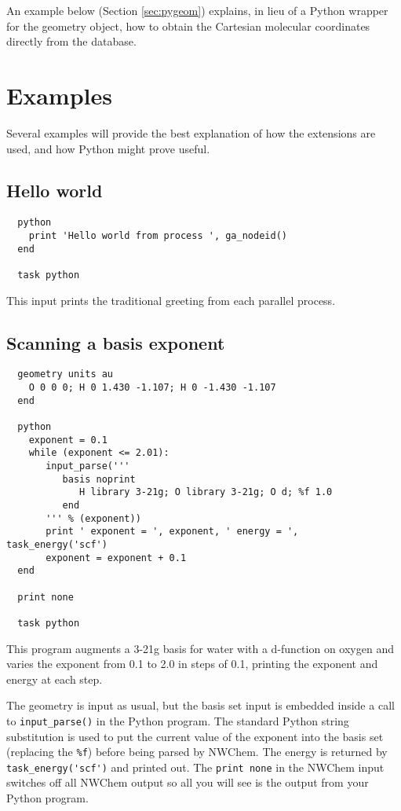 An example below (Section \ref{sec:pygeom}) explains, in lieu of a
Python wrapper for the geometry object, how to obtain the Cartesian
molecular coordinates directly from the database.

\section{Examples}

Several examples will provide the best explanation of how the extensions
are used, and how Python might prove useful.

\subsection{Hello world}

\begin{verbatim}
  python
    print 'Hello world from process ', ga_nodeid()
  end

  task python
\end{verbatim}

This input prints the traditional greeting from each parallel process.

\subsection{Scanning a basis exponent}
\begin{verbatim}
  geometry units au
    O 0 0 0; H 0 1.430 -1.107; H 0 -1.430 -1.107
  end

  python
    exponent = 0.1
    while (exponent <= 2.01):
       input_parse('''
          basis noprint
             H library 3-21g; O library 3-21g; O d; %f 1.0
          end
       ''' % (exponent))
       print ' exponent = ', exponent, ' energy = ', task_energy('scf')
       exponent = exponent + 0.1
  end

  print none

  task python
\end{verbatim}

This program augments a 3-21g basis for water with a d-function on
oxygen and varies the exponent from 0.1 to 2.0 in steps of 0.1,
printing the exponent and energy at each step.  

The geometry is input as usual, but the basis set input is embedded
inside a call to \verb+input_parse()+ in the Python program.  The
standard Python string substitution is used to put the current value of
the exponent into the basis set (replacing the \verb+%f+) before being
parsed by NWChem.  The energy is returned by \verb+task_energy('scf')+
and printed out.  The \verb+print none+ in the NWChem input switches
off all NWChem output so all you will see is the output from your
Python program.

